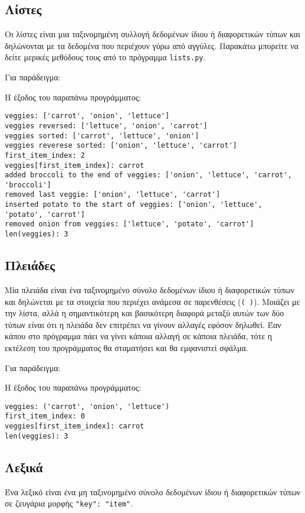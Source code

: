 \documentclass[12pt]{extreport}
\begin{document}
\subsection{Λίστες}
Οι λίστες είναι μια ταξινομημένη συλλογή δεδομένων ίδιου ή διαφορετικών τύπων και δηλώνονται με τα δεδομένα που περιέχουν γύρω από αγγύλες. Παρακάτω μπορείτε να δείτε μερικές μεθόδους τους από το πρόγραμμα \lstinline{lists.py}.

Για παράδειγμα:



Η έξοδος του παραπάνω προγράμματος:

\begin{lstlisting}[language={}]
veggies: ['carrot', 'onion', 'lettuce']
veggies reversed: ['lettuce', 'onion', 'carrot']
veggies sorted: ['carrot', 'lettuce', 'onion']
veggies reverese sorted: ['onion', 'lettuce', 'carrot']
first_item_index: 2
veggies[first_item_index]: carrot
added broccoli to the end of veggies: ['onion', 'lettuce', 'carrot', 'broccoli']
removed last veggie: ['onion', 'lettuce', 'carrot']
inserted potato to the start of veggies: ['onion', 'lettuce', 'potato', 'carrot']
removed onion from veggies: ['lettuce', 'potato', 'carrot']
len(veggies): 3
\end{lstlisting}

\subsection{Πλειάδες}
Μία πλειάδα είναι ένα ταξινομημένο σύνολο δεδομένων ίδιου ή διαφορετικών τύπων και δηλώνεται με τα στοιχεία που περιέχει ανάμεσα σε παρενθέσεις (\lstinline[language={}]{( )}). Μοιάζει με την λίστα, αλλά η σημαντικότερη και βασικότερη διαφορά μεταξύ αυτών των δύο τύπων είναι ότι η πλειάδα δεν επιτρέπει να γίνουν αλλαγές εφόσον δηλωθεί. Έαν κάπου στο πρόγραμμα πάει να γίνει κάποια αλλαγή σε κάποια πλειάδα, τότε η εκτέλεση του προγράμματος θα σταματήσει και θα εμφανιστεί σφάλμα.

Για παράδειγμα:



Η έξοδος του παραπάνω προγράμματος:

\begin{lstlisting}[language={}]
veggies: ('carrot', 'onion', 'lettuce')
first_item_index: 0
veggies[first_item_index]: carrot
len(veggies): 3
\end{lstlisting}



\newpage
\subsection{Λεξικά}
Ένα λεξικό είναι ένα μη ταξινομημένο σύνολο δεδομένων ίδιου ή διαφορετικών τύπων σε ζευγάρια μορφής \lstinline{"key": "item"}.
\end{document}
